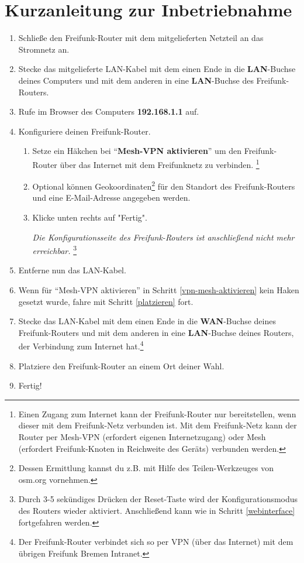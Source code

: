 \documentclass{article}
\begin{document}
\section*{Kurzanleitung zur Inbetriebnahme}

\begin{enumerate}
\item Schließe den Freifunk-Router mit dem mitgelieferten Netzteil an das Stromnetz an.

\item Stecke das mitgelieferte LAN-Kabel mit dem einen Ende in die \textbf{LAN}-Buchse deines Computers und mit dem anderen in eine \textbf{LAN}-Buchse des Freifunk-Routers.

\item Rufe im Browser des Computers \textbf{192.168.1.1} auf. \label{webinterface}

\item Konfiguriere deinen Freifunk-Router. 
\begin{enumerate}
  \item Setze ein Häkchen bei "`\textbf{Mesh-VPN aktivieren}"' um den Freifunk-Router über das Internet mit dem Freifunknetz zu verbinden. \label{vpn-mesh-aktivieren} \footnote{Einen Zugang zum Internet kann der Freifunk-Router nur bereitstellen, wenn dieser mit dem Freifunk-Netz verbunden ist. Mit dem Freifunk-Netz kann der Router per Mesh-VPN (erfordert eigenen Internetzugang) oder Mesh (erfordert Freifunk-Knoten in Reichweite des Geräts) verbunden werden.}
  
  \item Optional können Geokoordinaten\footnote{Dessen Ermittlung kannst du z.B. mit Hilfe des Teilen-Werkzeuges von osm.org vornehmen.} für den Standort des Freifunk-Routers und eine E-Mail-Adresse angegeben werden.

  \item Klicke unten rechts auf "Fertig". 

  \textit{Die Konfigurationsseite des Freifunk-Routers ist anschließend nicht mehr erreichbar.} \footnote{Durch 3-5 sekündiges Drücken der Reset-Taste wird der Konfigurationsmodus des Routers wieder aktiviert. Anschließend kann wie in Schritt \ref{webinterface} fortgefahren werden.}
\end{enumerate}

\item Entferne nun das LAN-Kabel.

\item Wenn für "`Mesh-VPN aktivieren"' in Schritt \ref{vpn-mesh-aktivieren} kein Haken gesetzt wurde, fahre mit Schritt \ref{platzieren} fort. 

\item Stecke das LAN-Kabel mit dem einen Ende in die \textbf{WAN}-Buchse deines Freifunk-Routers und mit dem anderen in eine \textbf{LAN}-Buchse deines Routers, der Verbindung zum Internet hat.\footnote{Der Freifunk-Router verbindet sich so per VPN (über das Internet) mit dem übrigen Freifunk Bremen Intranet.}

\item Platziere den Freifunk-Router an einem Ort deiner Wahl. \label{platzieren}

\item Fertig!
\end{enumerate}
\end{document}

